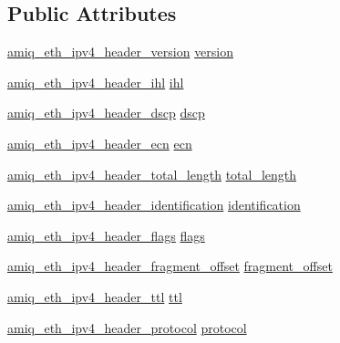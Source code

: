 \subsection*{Public Attributes}
\begin{DoxyCompactItemize}
\item 
\hyperlink{amiq__eth__types_8cpp_aff833347673c16ffca7cdc578df8a129}{amiq\_\-eth\_\-ipv4\_\-header\_\-version} \hyperlink{classamiq__eth__packet__ipv4__header_a423a9a3c8cff764466c8e8505175b389}{version}
\item 
\hyperlink{amiq__eth__types_8cpp_a67bcb1310f8e6b5011291dc92473c069}{amiq\_\-eth\_\-ipv4\_\-header\_\-ihl} \hyperlink{classamiq__eth__packet__ipv4__header_a1471c85788c2bda39aa344b62ba438d2}{ihl}
\item 
\hyperlink{amiq__eth__types_8cpp_a746acfee4abef933c8b5324401c41488}{amiq\_\-eth\_\-ipv4\_\-header\_\-dscp} \hyperlink{classamiq__eth__packet__ipv4__header_a8e82ba2350cd440d4a1e2e93a2979de6}{dscp}
\item 
\hyperlink{amiq__eth__types_8cpp_a3f41cfbf8793e170377ae7eeb07ad9ea}{amiq\_\-eth\_\-ipv4\_\-header\_\-ecn} \hyperlink{classamiq__eth__packet__ipv4__header_aaf142f739eebdae4966502146fb9a75b}{ecn}
\item 
\hyperlink{amiq__eth__types_8cpp_a412c06b1b8d0c33aa114c47d2a2fe158}{amiq\_\-eth\_\-ipv4\_\-header\_\-total\_\-length} \hyperlink{classamiq__eth__packet__ipv4__header_af8ba7e7d94dd07cfe3bf05262d4f768f}{total\_\-length}
\item 
\hyperlink{amiq__eth__types_8cpp_a78cd9f893a317511db4616928beb7b7a}{amiq\_\-eth\_\-ipv4\_\-header\_\-identification} \hyperlink{classamiq__eth__packet__ipv4__header_aa98286d51e49bc5296fe0c1ab08214c3}{identification}
\item 
\hyperlink{amiq__eth__types_8cpp_ac36c2f44d5ca5d99502342f80c748a64}{amiq\_\-eth\_\-ipv4\_\-header\_\-flags} \hyperlink{classamiq__eth__packet__ipv4__header_aea7ee65cc360e6ba9a900ddd459af4cd}{flags}
\item 
\hyperlink{amiq__eth__types_8cpp_a2737e3266b8669b20348759c155b859a}{amiq\_\-eth\_\-ipv4\_\-header\_\-fragment\_\-offset} \hyperlink{classamiq__eth__packet__ipv4__header_ab74e113c5af1421e19bcd0d3cee96ddf}{fragment\_\-offset}
\item 
\hyperlink{amiq__eth__types_8cpp_a7e8272e3f3274eda285549aedfb236bd}{amiq\_\-eth\_\-ipv4\_\-header\_\-ttl} \hyperlink{classamiq__eth__packet__ipv4__header_afd5c82dd540f32719d126eab22109646}{ttl}
\item 
\hyperlink{amiq__eth__types_8cpp_a7f7f43efd6c68e3e1350b10587f7f3c4}{amiq\_\-eth\_\-ipv4\_\-header\_\-protocol} \hyperlink{classamiq__eth__packet__ipv4__header_a953d6c50b41f787b55de8da471264515}{protocol}

\end{DoxyCompactItemize}
